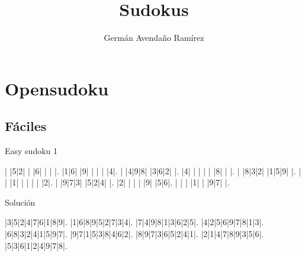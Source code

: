 \documentclass[10pt,a4paper]{article}
\author{Germán Avendaño Ramírez}
\title{Sudokus}
\begin{document}
\section*{Opensudoku}
\subsection*{F\'{a}ciles}
Easy sudoku 1
\begin{sudoku}
| |5|2| | |6| | | |.
|1|6| |9| | | | |4|.
| |4|9|8| |3|6|2| |.
|4| | | | | |8| | |.
| |8|3|2| |1|5|9| |.
| | |1| | | | | |2|.
| |9|7|3| |5|2|4| |.
|2| | | | |9| |5|6|.
| | | |1| | |9|7| |.
\end{sudoku}

\setlength\sudokusize{5cm}
Solución
\begin{sudoku}
|3|5|2|4|7|6|1|8|9|.
|1|6|8|9|5|2|7|3|4|.
|7|4|9|8|1|3|6|2|5|.
|4|2|5|6|9|7|8|1|3|.
|6|8|3|2|4|1|5|9|7|.
|9|7|1|5|3|8|4|6|2|.
|8|9|7|3|6|5|2|4|1|.
|2|1|4|7|8|9|3|5|6|.
|5|3|6|1|2|4|9|7|8|.
\end{sudoku}
\end{document}
